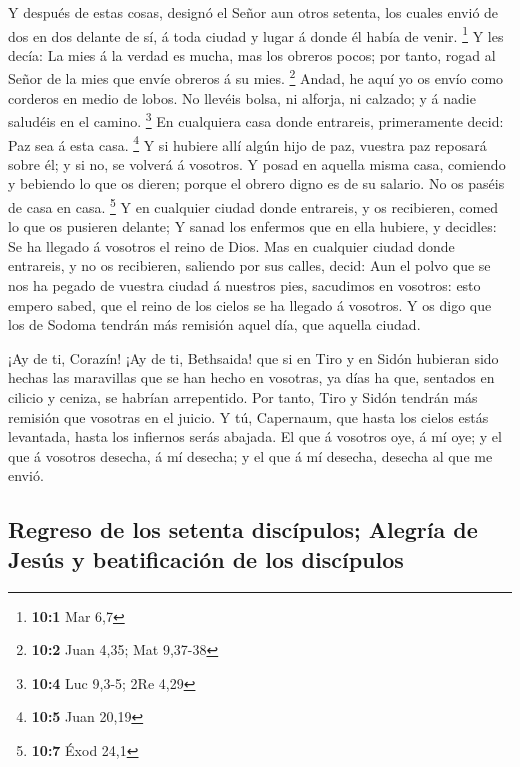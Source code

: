  Y después de estas cosas, designó el Señor aun otros
setenta, los cuales envió de dos en dos delante de sí, á toda ciudad y
lugar á donde él había de venir. \footnote{\textbf{10:1} Mar 6,7}
 Y les decía: La mies á la verdad es mucha, mas los obreros
pocos; por tanto, rogad al Señor de la mies que envíe obreros á su mies.
\footnote{\textbf{10:2} Juan 4,35; Mat 9,37-38}  Andad, he
aquí yo os envío como corderos en medio de lobos.  No
llevéis bolsa, ni alforja, ni calzado; y á nadie saludéis en el camino.
\footnote{\textbf{10:4} Luc 9,3-5; 2Re 4,29}  En cualquiera
casa donde entrareis, primeramente decid: Paz sea á esta casa.
\footnote{\textbf{10:5} Juan 20,19}  Y si hubiere allí algún
hijo de paz, vuestra paz reposará sobre él; y si no, se volverá á
vosotros.  Y posad en aquella misma casa, comiendo y
bebiendo lo que os dieren; porque el obrero digno es de su salario. No
os paséis de casa en casa. \footnote{\textbf{10:7} Éxod 24,1}
 Y en cualquier ciudad donde entrareis, y os recibieren,
comed lo que os pusieren delante;  Y sanad los enfermos que
en ella hubiere, y decidles: Se ha llegado á vosotros el reino de Dios.
 Mas en cualquier ciudad donde entrareis, y no os
recibieren, saliendo por sus calles, decid:  Aun el polvo
que se nos ha pegado de vuestra ciudad á nuestros pies, sacudimos en
vosotros: esto empero sabed, que el reino de los cielos se ha llegado á
vosotros.  Y os digo que los de Sodoma tendrán más remisión
aquel día, que aquella ciudad.

 ¡Ay de ti, Corazín! ¡Ay de ti, Bethsaida! que si en Tiro y
en Sidón hubieran sido hechas las maravillas que se han hecho en
vosotras, ya días ha que, sentados en cilicio y ceniza, se habrían
arrepentido.  Por tanto, Tiro y Sidón tendrán más remisión
que vosotras en el juicio.  Y tú, Capernaum, que hasta los
cielos estás levantada, hasta los infiernos serás abajada. 
El que á vosotros oye, á mí oye; y el que á vosotros desecha, á mí
desecha; y el que á mí desecha, desecha al que me envió.

\hypertarget{regreso-de-los-setenta-discuxedpulos-alegruxeda-de-jesuxfas-y-beatificaciuxf3n-de-los-discuxedpulos}{%
\subsection{Regreso de los setenta discípulos; Alegría de Jesús y
beatificación de los
discípulos}\label{regreso-de-los-setenta-discuxedpulos-alegruxeda-de-jesuxfas-y-beatificaciuxf3n-de-los-discuxedpulos}}

